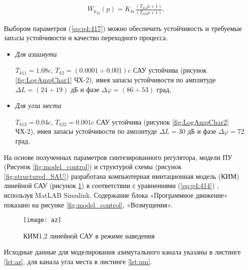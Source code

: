 \begin{equation}%
\label{eq:p4:417}
\begin{alignedat}{2}
{W_{k}}_{ii} \left( p \right) =K_{ki}\frac{ \left( T_{k1i}p+1 \right) }{ \left( T_{k2i}p+1 \right) }.
\end{alignedat}
\end{equation}

Выбором параметров (\ref{eq:p4:417}) можно обеспечить устойчивость и требуемые запaсы устойчивости и качество переходного процесса. 
\begin{itemize}
	\item \textit{Для азиимута}\par
	$T_{k11} = 1.08 c$, $T_{k2} = (0.0001  \div 0.001) c$  САУ устойчива (рисунок \ref{fig:LogAmpChar1} ЧХ-2), имея запасы устойчивости по амплитуде $\varDelta L = (24 \div 19)$ дБ и фазе $\varDelta \varphi = (86 \div 53)$ град,
	\item \textit{Для угла места}\par
	$T_{k12} = 0.04 c$, $T_{k22} =  0.001 c$  САУ устойчива (рисунок \ref{fig:LogAmpChar2} ЧХ-2), имея запасы устойчивости по амплитуде $\varDelta L = 30$ дБ и фазе $\varDelta \varphi = 72$ град.
\end{itemize}

На основе полученных параметров синтезированного регулятора, модели ПУ (Рисунок \ref{fig:model_control}) и структурой схемы (рисунок \ref{fig:structured_SAU}) разработана компьютерная имитационная модель (КИМ) линейной САУ (рисунок \ref{fig:az}) в соответствии с уравнениями (\ref{eq:p4:414}) , используя MatLAB Simulink. Содержание блока «Программное движение» показано на рисунке \ref{fig:model_control}, «Возмущения». 

\begin{figure}[ht]
	\centering
	\texttt{[image: az]} 
	\caption{КИМ1,2 линейной САУ в режиме наведения}
	\label{fig:az}
\end{figure}

Исходные данные для моделирования азимутального канала указаны в листинге \ref{lst:az}, для канала угла места в листинге \ref{lst:um}. 

\begingroup
\captiondelim{ } %

\endgroup

\begingroup
\captiondelim{ } %

\endgroup

